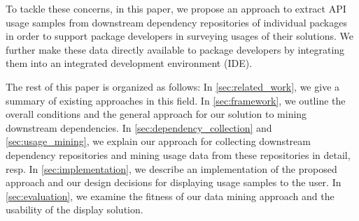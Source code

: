 To tackle these concerns, in this paper, we propose an approach to extract API usage samples from downstream dependency repositories of individual packages in order to support package developers in surveying usages of their solutions.
We further make these data directly available to package developers by integrating them into an integrated development environment (IDE).

The rest of this paper is organized as follows:
In \cref{sec:related_work}, we give a summary of existing approaches in this field.
In \cref{sec:framework}, we outline the overall conditions and the general approach for our solution to mining downstream dependencies.
In \cref{sec:dependency_collection} and \cref{sec:usage_mining}, we explain our approach for collecting downstream dependency repositories and mining usage data from these repositories in detail, resp.
In \cref{sec:implementation}, we describe an implementation of the proposed approach and our design decisions for displaying usage samples to the user.
In \cref{sec:evaluation}, we examine the fitness of our data mining approach and the usability of the display solution.
